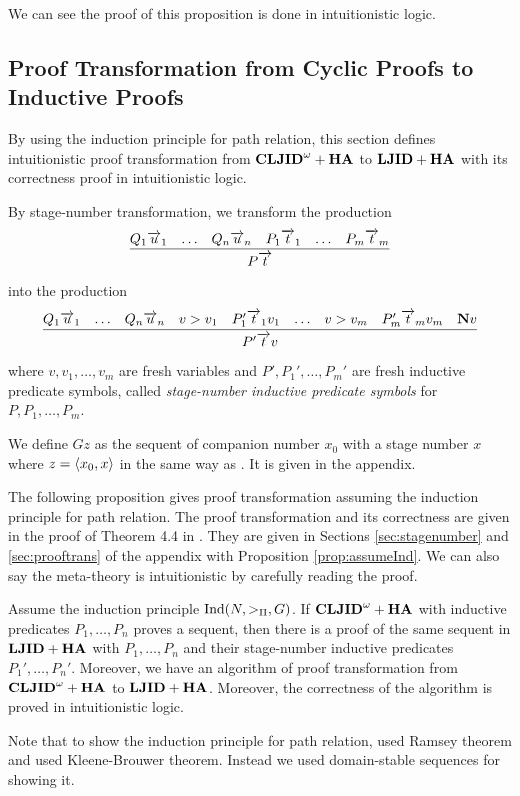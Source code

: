 We can see the proof of this proposition is done in intuitionistic logic.

\subsection{Proof Transformation from Cyclic Proofs to Inductive Proofs}

By using the induction principle for path relation,
this section defines intuitionistic proof transformation
from ${{\bf CLJID}^\omega+{\bf HA}}$ to ${{\bf LJID}+{\bf HA}}$ with its correctness proof in intuitionistic logic.

By stage-number transformation,
we transform the production 
\[
\infer{P\Vec t}{Q_1\Vec u_1 & \ldots & Q_n\Vec u_n & P_1\Vec t_1 & \ldots & P_m\Vec t_m}
\]
into the production 
\[
\infer{P'\Vec tv}{Q_1\Vec u_1 & \ldots & Q_n\Vec u_n & v > v_1 & P'_1\Vec t_1v_1 & \ldots & v > v_m & P'_m\Vec t_mv_m & \N v}
\]
where $v,v_1,\ldots,v_m$ are fresh variables
and $P',P_1',\ldots,P_m'$ are fresh inductive predicate symbols,
called {\em stage-number inductive predicate symbols} for $P,P_1,\ldots,P_m$.

We define $Gz$ as
the sequent of companion number $x_0$ with a stage number $x$
where $z=\langle x_0,x\rangle$ in the same way as \cite{Berardi18}.
It is given in the appendix.

The following proposition gives
proof transformation
assuming the induction principle for path relation.
The proof transformation and its correctness are given
in the proof of Theorem 4.4 in \cite{Berardi18}.
They are given in Sections \ref{sec:stagenumber}
and \ref{sec:prooftrans} of the appendix with Proposition \ref{prop:assumeInd}.
We can also say the meta-theory is intuitionistic
by carefully reading the proof.

\begin{Prop}\label{prop:assuming}
Assume the induction principle ${\rm Ind}(N,>_\Pi,G)$.
If ${{\bf CLJID}^\omega+{\bf HA}}$ with inductive predicates $P_1,\ldots,P_n$ proves a sequent,
then there is a proof of the same sequent in ${{\bf LJID}+{\bf HA}}$ with $P_1,\ldots,P_n$ and their stage-number inductive predicates $P_1',\ldots,P_n'$.
Moreover, we have an algorithm of
proof transformation from ${{\bf CLJID}^\omega+{\bf HA}}$ to ${{\bf LJID}+{\bf HA}}$.
Moreover, the correctness of the algorithm is proved in intuitionistic logic.
\end{Prop}

Note that to show the induction principle for path relation,
\cite{Berardi17a} used Ramsey theorem and
\cite{Berardi18} used Kleene-Brouwer theorem.
Instead we used domain-stable sequences for showing it.

